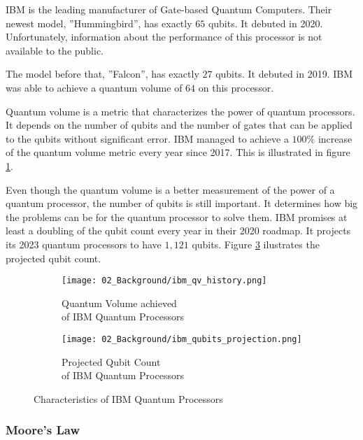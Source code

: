 IBM is the leading manufacturer of Gate-based Quantum Computers.
Their newest model, ''Hummingbird'', has exactly $65$ qubits.
It debuted in 2020.
Unfortunately, information about the performance of this processor is not available to the public.
\cite{IBMRoadmap2020}

The model before that, ''Falcon'', has exactly $27$ qubits.
It debuted in 2019.
IBM was able to achieve a quantum volume of $64$ on this processor.
\cite{IBMRoadmap2020}

Quantum volume is a metric that characterizes the power of quantum processors.
It depends on the number of qubits and the number of gates that can be applied to the qubits without significant error.
\cite{Bishop2017}
IBM managed to achieve a $100\%$ increase of the quantum volume metric every year since 2017.
\cite{IBMqv2020}
This is illustrated in figure \ref{figure:gate.qv.history}.

Even though the quantum volume is a better measurement of the power of a quantum processor, the number of qubits is still important.
It determines how big the problems can be for the quantum processor to solve them.
IBM promises at least a doubling of the qubit count every year in their 2020 roadmap.
It projects its 2023 quantum processors to have $1, 121$ qubits.
Figure \ref{figure:gate.qbits.projection} ilustrates the projected qubit count.
\cite{IBMRoadmap2020}

\begin{figure}
  \begin{subfigure}[b]{0.5 \textwidth}
    \centering
    \texttt{[image: 02\_Background/ibm\_qv\_history.png]}
    \caption{Quantum Volume achieved\\ of IBM Quantum Processors \cite{IBMqv2020}}
    \label{figure:gate.qv.history}
  \end{subfigure}
  \begin{subfigure}[b]{0.5 \textwidth}
    \centering
    \texttt{[image: 02\_Background/ibm\_qubits\_projection.png]}
    \caption{Projected Qubit Count\\ of IBM Quantum Processors \cite{IBMRoadmap2020}}
    \label{figure:gate.qbits.projection}
  \end{subfigure}
  \caption{Characteristics of IBM Quantum Processors}
\end{figure}

\subsubsection{Moore's Law}

